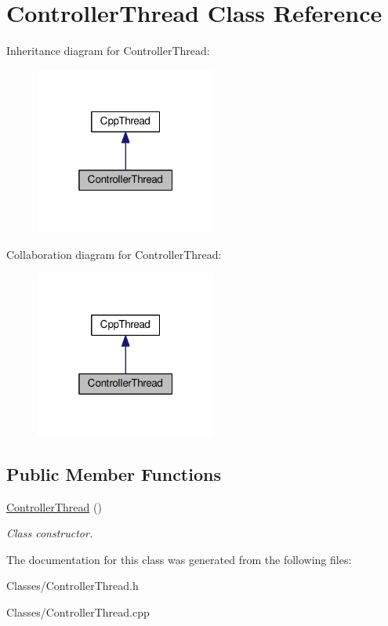 \hypertarget{classControllerThread}{}\section{Controller\+Thread Class Reference}
\label{classControllerThread}


Inheritance diagram for Controller\+Thread\+:\nopagebreak
\begin{figure}[H]
\begin{center}
\leavevmode
\includegraphics[width=169pt]{classControllerThread__inherit__graph}
\end{center}
\end{figure}


Collaboration diagram for Controller\+Thread\+:\nopagebreak
\begin{figure}[H]
\begin{center}
\leavevmode
\includegraphics[width=169pt]{classControllerThread__coll__graph}
\end{center}
\end{figure}
\subsection*{Public Member Functions}
\begin{DoxyCompactItemize}
\item 
\mbox{\label{classControllerThread_a00cd6502504f5f1e680e6be3f60a987d}} 
\mbox{\hyperlink{classControllerThread_a00cd6502504f5f1e680e6be3f60a987d}{Controller\+Thread}} ()
\begin{DoxyCompactList}\small\item\em Class constructor. \end{DoxyCompactList}\end{DoxyCompactItemize}


The documentation for this class was generated from the following files\+:\begin{DoxyCompactItemize}
\item 
Classes/Controller\+Thread.\+h\item 
Classes/Controller\+Thread.\+cpp\end{DoxyCompactItemize}
